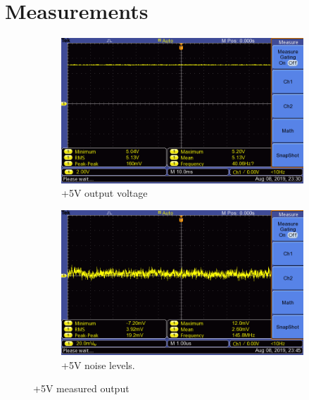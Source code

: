  
\section{Measurements} \label{sec:measurements_linear}
\begin{figure} 
 \centering
 
    \begin{subfigure}[]{0.49\linewidth}
        \centering
        \includegraphics[width=1.\linewidth,clip,trim = 0cm 0cm 2.5cm 0cm]{./Figures/5v_test}
        \caption{+5V output voltage}
        \label{fig:5v_output_measurement}
    \end{subfigure}
    \begin{subfigure}[]{0.49\linewidth}
        \centering
        \includegraphics[width=1.\linewidth,clip,trim = 0cm 0cm 2.5cm 0cm]{./Figures/5v_noise_test}
        \caption{+5V noise levels.}
        \label{fig:5v_noise_measurement}
    \end{subfigure}
    
\caption{+5V measured output}
\label{fig:5v_measurement_box}
\end{figure}








